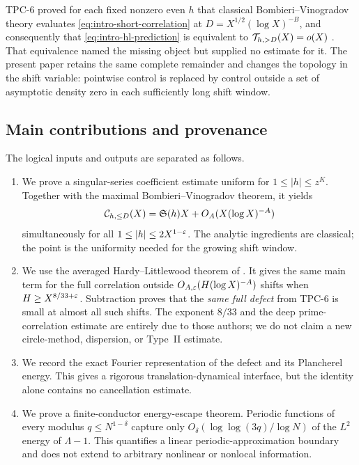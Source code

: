 TPC-6 proved for each fixed nonzero even $h$ that classical
Bombieri--Vinogradov theory
evaluates \eqref{eq:intro-short-correlation} at
$D=X^{1/2}(\log X)^{-B}$, and consequently that
\eqref{eq:intro-hl-prediction} is equivalent to
$\mathcal T_{h,>D}(X)=o(X)$ \citep{WangTPCSix2026}.  That equivalence named the
missing object but supplied no estimate for it.  The present paper retains
the same complete remainder and changes the topology in the shift variable:
pointwise control is replaced by control outside a set of asymptotic density
zero in each sufficiently long shift window.

\subsection{Main contributions and provenance}
\label{subsec:intro-contributions}

The logical inputs and outputs are separated as follows.
\begin{enumerate}[label=\textbf{R\arabic*.},leftmargin=3.2em]
 \item We prove a singular-series coefficient estimate uniform for
 $1\le|h|\le z^K$.  Together with the maximal
 Bombieri--Vinogradov theorem, it yields
 \[
  \mathcal C_{h,\le D}(X)
  =\mathfrak S(h)X+O_A(X(\log X)^{-A})
 \]
 simultaneously for all $1\le|h|\le2X^{1-\varepsilon}$.  The analytic ingredients
 are classical; the point is the uniformity needed for the growing shift
 window.
 \item We use the averaged Hardy--Littlewood theorem of
 \citet[Theorem~1.3(i)]{MatomakiRadziwillTao2019}.  It gives the same main
 term for the full correlation outside
 $O_{A,\varepsilon}(H(\log X)^{-A})$ shifts when
 $H\ge X^{8/33+\varepsilon}$.  Subtraction proves that the \emph{same full defect}
 from TPC-6 is small at almost all such shifts.  The exponent $8/33$ and the
 deep prime-correlation estimate are entirely due to those authors; we do
 not claim a new circle-method, dispersion, or Type~II estimate.
 \item We record the exact Fourier representation of the defect and its
 Plancherel energy.  This gives a rigorous translation-dynamical interface,
 but the identity alone contains no cancellation estimate.
 \item We prove a finite-conductor energy-escape theorem.  Periodic
 functions of every modulus $q\le N^{1-\delta}$ capture only
 $O_\delta(\log\log(3q)/\log N)$ of the $L^2$ energy of $\Lambda-1$.  This
 quantifies a linear periodic-approximation boundary and does not extend to
 arbitrary nonlinear or nonlocal information.
\end{enumerate}

